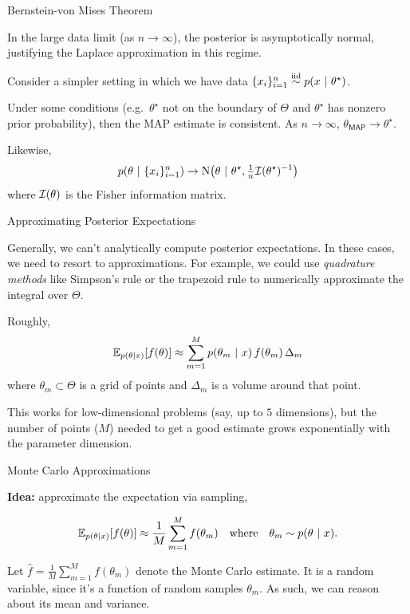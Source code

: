 \documentclass[aspectratio=169]{beamer}
\begin{document}
\begin{frame}[t,allowframebreaks]{Bernstein-von Mises
Theorem}\label{bernstein-von-mises-theorem}

In the large data limit (as \(n \to \infty\)), the posterior is
asymptotically normal, justifying the Laplace approximation in this
regime.

Consider a simpler setting in which we have data
\(\{x_i\}_{i=1}^n \stackrel{\text{iid}}{\sim} p(x ~\vert~ \theta^\star)\).

Under some conditions (e.g.~\(\theta^\star\) not on the boundary of
\(\Theta\) and \(\theta^\star\) has nonzero prior probability), then the
MAP estimate is consistent. As \(n \to \infty\),
\(\theta_{\mathsf{MAP}} \to \theta^\star\).

Likewise, \begin{align*} 
    p(\theta ~\vert~ \{x_i\}_{i=1}^n) \to \mathrm{N} \big(\theta ~\vert~ \theta^\star, \tfrac{1}{n} \mathcal{I}(\theta^\star)^{-1} \big)
\end{align*} where \(\mathcal{I}(\theta)\) is the Fisher information matrix.

\end{frame}    

\begin{frame}[t,allowframebreaks]{Approximating Posterior
Expectations}\label{approximating-posterior-expectations}

Generally, we can't analytically compute posterior expectations. In
these cases, we need to resort to approximations. For example, we could
use \emph{quadrature methods} like Simpson's rule or the trapezoid rule
to numerically approximate the integral over \(\Theta\).

Roughly, \begin{align*}
\mathbb{E}_{p(\theta | x)}[f(\theta)] \approx \sum_{m=1}^M p(\theta_m ~\vert~ x) \, f(\theta_m) \, \Delta_m
\end{align*} where \(\theta_m \subset \Theta\) is a grid of points and
\(\Delta_m\) is a volume around that point.

This works for low-dimensional problems (say, up to \(5\) dimensions),
but the number of points (\(M\)) needed to get a good estimate grows
exponentially with the parameter dimension.
\end{frame}

\begin{frame}[t,allowframebreaks]{Monte Carlo
Approximations}\label{monte-carlo-approximations}

\textbf{Idea:} approximate the expectation via sampling,

\begin{align*}
\mathbb{E}_{p(\theta | x)}[f(\theta)] \approx \frac{1}{M} \sum_{m=1}^M f(\theta_m) \quad \text{where} \quad \theta_m \sim p(\theta ~\vert~ x).
\end{align*}

Let \(\hat{f} = \frac{1}{M} \sum_{m=1}^M f(\theta_m)\) denote the Monte
Carlo estimate. It is a random variable, since it's a function of random
samples \(\theta_m\). As such, we can reason about its mean and
variance.
\end{frame}
\end{document}
